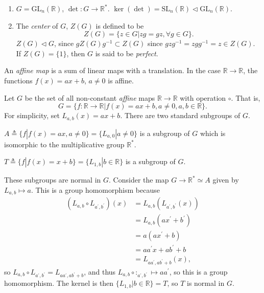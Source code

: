 \documentclass{article}
\begin{document}
\begin{xmpl}
\begin{enumerate}
  \item{$G = \mathrm{\mathrm{GL}}_n(\mathbb{R})$, $\det : G \to \mathbb{R}^\ast$.
        $\ker(\det) = \mathrm{SL}_n(\mathbb{R}) 
                    \triangleleft \mathrm{\mathrm{GL}}_n(\mathbb{R})$.
       }
  \item{The \emph{center} of $G$, $Z(G)$ is defined to be
        $$
        Z(G) = \{ z \in G | z g = g z, \forall g \in G \}.
        $$
        $Z(G) \triangleleft G$, since $g Z(G) g^{-1} \subset Z(G)$
        since $g z g^{-1} = z g g^{-1} = z \in Z(G)$. If 
        $Z(G) = \{1\}$, then $G$ is said to be \emph{perfect}.
        }
\end{enumerate}
\end{xmpl}


\begin{defn}
An \emph{affine map} is a sum of linear maps with a translation. In
the case $\mathbb{R} \to \mathbb{R}$, the functions $f(x) = ax + b$,
$a \neq 0$ is affine.
\end{defn}

\begin{xmpl}
Let $G$ be the set of all non-constant \emph{affine} maps 
$\mathbb{R} \to \mathbb{R}$ with operation $\circ$. That is,
$$
G = \{ f : \mathbb{R} \to \mathbb{R} | f(x) = ax + b, 
                                       a \neq 0,
                                       a, b \in \mathbb{R}
    \}.
$$
For simplicity, set $L_{a,b}(x) = ax + b$. There are two standard
subgroups of $G$. 

$A \triangleq \{ f | f(x) = ax, a \neq 0 \} = \{L_{a, 0} | a \neq 0\}$
is a subgroup of $G$ which is isomorphic to the multiplicative group
$\mathbb{R}^\ast$.

$T \triangleq \{ f | f(x) = x + b \} = \{ L_{1,b} | b \in \mathbb{R}
\}$ is a subgroup of $G$. 

These subgroups are normal in $G$. Consider the map 
$G \to \mathbb{R}^\ast \simeq A$ given by $L_{a,b} \mapsto a$. This is
a group homomorphism because
\begin{align*}
(L_{a,b} \circ L_{a^\prime, b^\prime})(x) 
 & = L_{a,b}(L_{a^\prime, b^\prime}(x)) \\
 & = L_{a,b}(ax^\prime + b^\prime) \\
 & = a(ax^\prime + b) \\
 & = aa^\prime x + ab^\prime + b \\
 & = L_{a a^\prime, a b^\prime + b}(x),
\end{align*}
so $L_{a,b} \circ L_{a^\prime, b^\prime} = L_{a a^\prime, a b^\prime +
  b}$, and thus
$L_{a,b} \circ :_{a^\prime, b^\prime} \mapsto a a^\prime$, so this is
a group homomorphism. The kernel is then 
$\{L_{1,b} | b \in \mathbb{R} \} = T$, so $T$ is normal in $G$.
\end{xmpl}
\end{document}
